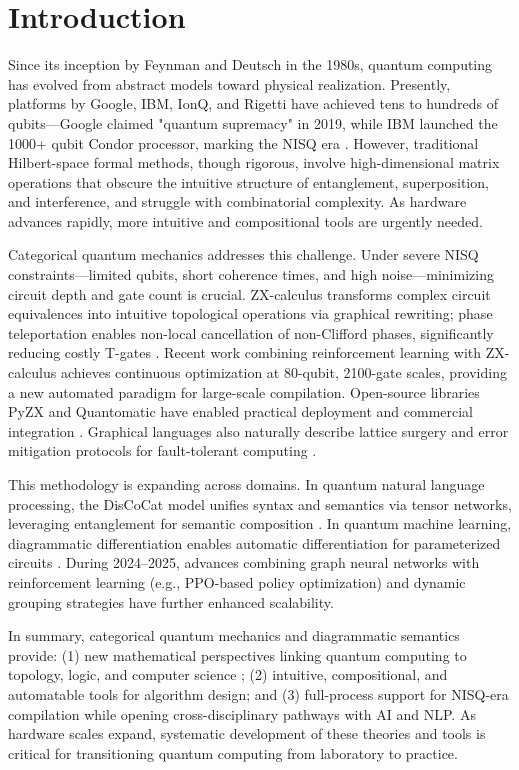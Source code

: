 \documentclass[a4paper,twocolumn,11pt,unpublished]{quantumarticle}
\numberwithin{equation}{section}
\begin{document}
\section{Introduction}

Since its inception by Feynman and Deutsch in the 1980s, quantum computing has evolved from abstract models toward physical realization. Presently, platforms by Google, IBM, IonQ, and Rigetti have achieved tens to hundreds of qubits—Google claimed "quantum supremacy" in 2019, while IBM launched the 1000+ qubit Condor processor, marking the NISQ era  \cite{NC11, BK23}. However, traditional Hilbert-space formal methods, though rigorous, involve high-dimensional matrix operations that obscure the intuitive structure of entanglement, superposition, and interference, and struggle with combinatorial complexity. As hardware advances rapidly, more intuitive and compositional tools are urgently needed.

Categorical quantum mechanics addresses this challenge. Under severe NISQ constraints—limited qubits, short coherence times, and high noise—minimizing circuit depth and gate count is crucial. ZX-calculus transforms complex circuit equivalences into intuitive topological operations via graphical rewriting; phase teleportation enables non-local cancellation of non-Clifford phases, significantly reducing costly T-gates \cite{KvdW20}. Recent work combining reinforcement learning with ZX-calculus achieves continuous optimization at 80-qubit, 2100-gate scales, providing a new automated paradigm for large-scale compilation. Open-source libraries PyZX and Quantomatic have enabled practical deployment and commercial integration  \cite{KZ15}. Graphical languages also naturally describe lattice surgery and error mitigation protocols for fault-tolerant computing  \cite{DH19, DPZ24}.

This methodology is expanding across domains. In quantum natural language processing, the DisCoCat model unifies syntax and semantics via tensor networks, leveraging entanglement for semantic composition  \cite{CCS10, MGT20}. In quantum machine learning, diagrammatic differentiation enables automatic differentiation for parameterized circuits \cite{TYF21}. During 2024–2025, advances combining graph neural networks with reinforcement learning (e.g., PPO-based policy optimization) and dynamic grouping strategies have further enhanced scalability.

In summary, categorical quantum mechanics and diagrammatic semantics provide: (1) new mathematical perspectives linking quantum computing to topology, logic, and computer science \cite{HV19,  KM19,CDKW12, Vic13}; (2) intuitive, compositional, and automatable tools for algorithm design; and (3) full-process support for NISQ-era compilation while opening cross-disciplinary pathways with AI and NLP. As hardware scales expand, systematic development of these theories and tools is critical for transitioning quantum computing from laboratory to practice.
\end{document}
